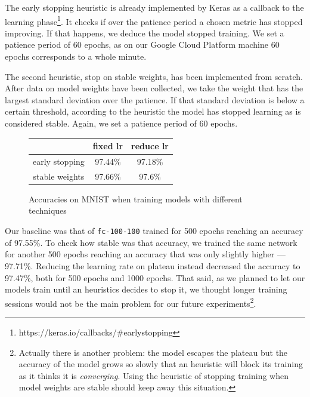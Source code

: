 The early stopping heuristic is already implemented by Keras as a callback to the
learning phase\footnote{https://keras.io/callbacks/\#earlystopping}. It
checks if over the patience period a chosen metric has stopped improving. If
that happens, we deduce the model stopped training. We set a patience period of
60 epochs, as on our Google Cloud Platform machine 60 epochs corresponds
to a whole minute.

The second heuristic, stop on stable weights, has been implemented from
scratch. After data on model weights have been collected, we take the
weight that has the largest standard deviation over the patience. If
that standard deviation is below a certain threshold, according to the
heuristic the model has stopped learning as is considered stable.
Again, we set a patience period of 60 epochs.

\begin{figure}
  \centering
  \begin{tabular}{|c|c|c|}
    \hline
    & fixed lr & reduce lr \\
    \hline
    early stopping & 97.44\% & 97.18\% \\
    \hline
    stable weights & 97.66\% & 97.6\% \\
    \hline
  \end{tabular}
  \caption{Accuracies on MNIST when training models with different techniques}
  \label{fig:accuracy-heuristics}
\end{figure}

Our baseline was that of \texttt{fc-100-100} trained for 500 epochs
reaching an accuracy of 97.55\%. To check how stable was that accuracy,
we trained the same network for another 500 epochs reaching an accuracy
that was only slightly higher --- 97.71\%. Reducing the learning rate
on plateau instead decreased the accuracy to 97.47\%, both for 500
epochs and 1000 epochs. That said, as we planned to let our models
train until an heuristics decides to stop it, we thought longer training
sessions would not be the main problem for our future
experiments\footnote{Actually there is another problem: the model
  escapes the plateau but the accuracy of the model grows so slowly
  that an heuristic will block its training as it thinks it is
  \emph{converging}. Using the heuristic of stopping training when
  model weights are stable should keep away this situation.}.

